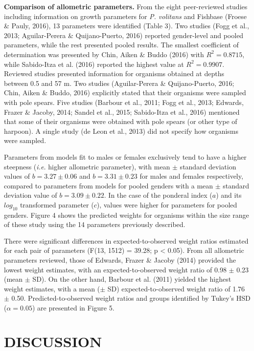 \documentclass[12pt,]{article}
\begin{document}
\textbf{Comparison of allometric parameters.} From the eight
peer-reviewed studies including information on growth parameters for
\emph{P. volitans} and Fishbase (Froese \& Pauly, 2016), 13 parameters
were identified (Table 3). Two studies (Fogg et al., 2013;
Aguilar-Perera \& Quijano-Puerto, 2016) reported gender-level and pooled
parameters, while the rest presented pooled results. The smallest
coefficient of determination was presented by Chin, Aiken \& Buddo
(2016) with \(R^2 = 0.8715\), while Sabido-Itza et al. (2016) reported
the highest value at \(R^2 = 0.9907\). Reviewed studies presented
information for organisms obtained at depths between 0.5 and 57 m. Two
studies (Aguilar-Perera \& Quijano-Puerto, 2016; Chin, Aiken \& Buddo,
2016) explicitly stated that their organisms were sampled with pole
spears. Five studies (Barbour et al., 2011; Fogg et al., 2013; Edwards,
Frazer \& Jacoby, 2014; Sandel et al., 2015; Sabido-Itza et al., 2016)
mentioned that some of their organisms were obtained with pole spears
(or other type of harpoon). A single study (de Leon et al., 2013) did
not specify how organisms were sampled.

Parameters from models fit to males or females exclusively tend to have
a higher steepness (\emph{i.e.} higher allometric parameter), with mean
\(\pm\) standard deviation values of \(b = 3.27 \pm 0.06\) and
\(b = 3.31 \pm 0.23\) for males and females respectively, compared to
parameters from models for pooled genders with a mean \(\pm\) standard
deviation value of \(b = 3.09 \pm 0.22\). In the case of the ponderal
index (\(a\)) and its \(log_{10}\) transformed parameter (\(c\)), values
were higher for parameters for pooled genders. Figure 4 shows the
predicted weights for organisms within the size range of these study
using the 14 parameters previously described.

There were significant differences in expected-to-observed weight ratios
estimated for each pair of parameters (F(13, 1512) = 39.28; p
\textless{} 0.05). From all allometric parameters reviewed, those of
Edwards, Frazer \& Jacoby (2014) provided the lowest weight estimates,
with an expected-to-observed weight ratio of 0.98 \(\pm\) 0.23 (mean
\(\pm\) SD). On the other hand, Barbour et al. (2011) yielded the
highest weight estimates, with a mean (\(\pm\) SD) expected-to-observed
weight ratio of 1.76 \(\pm\) 0.50. Predicted-to-observed weight ratios
and groups identified by Tukey's HSD (\(\alpha = 0.05\)) are presented
in Figure 5.

\section{DISCUSSION}\label{discussion}
\end{document}
